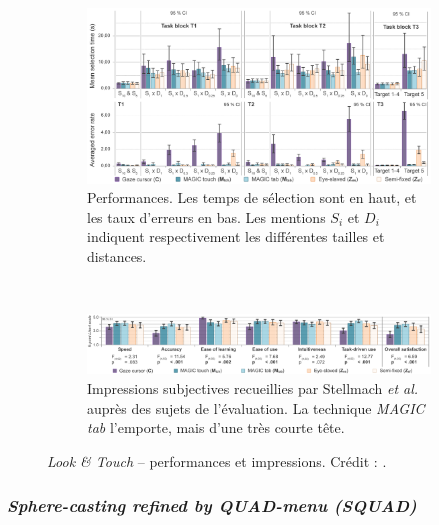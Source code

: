 \begin{appendices}
	\begin{figure}[!htbp]
		\begin{subfigure}[t]{\textwidth}
			\centering
			\includegraphics[width=\textwidth]{figures/ch2/latRes}
			\caption[\emph{Look \&{} Touch} -- performances]{Performances. Les temps de sélection sont en haut, et les taux d'erreurs en bas. Les mentions $S_{i}$ et $D_{i}$ indiquent respectivement les différentes tailles et distances.}
			\label{fig:latRes}
		\end{subfigure}
		~
		\begin{subfigure}[t]{\textwidth}
			\centering
			\includegraphics[width=\textwidth]{figures/ch2/latSubj}
			\caption[\emph{Look \&{} Touch} -- impressions subjectives]{Impressions subjectives recueillies par Stellmach \emph{et al.} auprès des sujets de l'évaluation. La technique \emph{MAGIC tab} l'emporte, mais d'une très courte tête.}
			\label{fig:latSubj}
		\end{subfigure}
		\caption[\emph{Look \&{} Touch} -- performances]{\emph{Look \&{} Touch} -- performances et impressions. Crédit : \cite{stellmach2012look}.}
	\end{figure}
	
	
	
	
	\subsubsection{\emph{Sphere-casting refined by QUAD-menu
(SQUAD)}}
	

\end{appendices}
